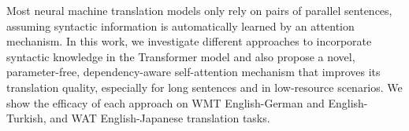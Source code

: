 Most neural machine translation models only rely on pairs of parallel sentences, assuming syntactic information is automatically learned by an attention mechanism. In this work, we investigate different approaches to incorporate syntactic knowledge in the Transformer model and also propose a novel, parameter-free, dependency-aware self-attention mechanism that improves its translation quality, especially for long sentences and in low-resource scenarios. We show the efficacy of each approach on WMT English-German and English-Turkish, and WAT English-Japanese translation tasks.
